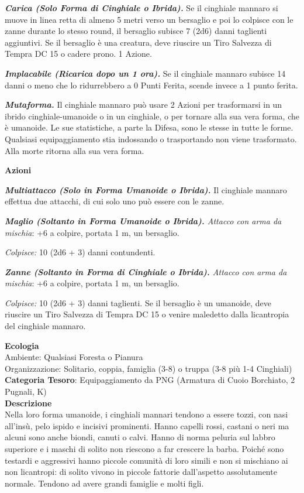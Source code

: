 \begin{multicols}{2}
{\emph{\textbf{Carica (Solo Forma di Cinghiale o Ibrida).}} Se il cinghiale mannaro si muove in linea retta di almeno 5 metri verso un bersaglio e poi lo colpisce con le zanne durante lo stesso round, il bersaglio subisce 7 (2d6) danni taglienti aggiuntivi. Se il bersaglio è una creatura, deve riuscire un Tiro Salvezza di Tempra DC 15 o cadere prono. 1 Azione.

\emph{\textbf{Implacabile (Ricarica dopo un 1 ora).}} Se il cinghiale mannaro subisce 14 danni o meno che lo ridurrebbero a 0 Punti Ferita, scende invece a 1 punto ferita.

\emph{\textbf{Mutaforma.}} Il cinghiale mannaro può usare 2 Azioni per trasformarsi in un ibrido cinghiale-umanoide o in un cinghiale, o per tornare alla sua vera forma, che è umanoide. Le sue statistiche, a parte la Difesa, sono le stesse in tutte le forme. Qualsiasi equipaggiamento stia indossando o trasportando non viene trasformato. Alla morte ritorna alla sua vera forma.

\textbf{Azioni}

\emph{\textbf{Multiattacco (Solo in Forma Umanoide o Ibrida).}} Il cinghiale mannaro effettua due attacchi, di cui solo uno può essere con le zanne.

\emph{\textbf{Maglio (Soltanto in Forma Umanoide o Ibrida).} Attacco con arma da mischia}: +6 a colpire, portata 1 m, un bersaglio.

\emph{Colpisce:} 10 (2d6 + 3) danni contundenti.

\emph{\textbf{Zanne (Soltanto in Forma di Cinghiale o Ibrida).} Attacco con arma da mischia}: +6 a colpire, portata 1 m, un bersaglio.

\emph{Colpisce:} 10 (2d6 + 3) danni taglienti. Se il bersaglio è un umanoide, deve riuscire un Tiro Salvezza di Tempra DC 15 o venire maledetto dalla licantropia del cinghiale mannaro.

\textbf{Ecologia}\\
Ambiente: Qualsiasi Foresta o Pianura\\
Organizzazione: Solitario, coppia, famiglia (3-8) o truppa (3-8 più 1-4 Cinghiali)\\
\textbf{Categoria Tesoro}: Equipaggiamento da PNG (Armatura di Cuoio Borchiato, 2 Pugnali, K)\\
\textbf{Descrizione}\\
Nella loro forma umanoide, i cinghiali mannari tendono a essere tozzi, con nasi all'insù, pelo ispido e incisivi prominenti. Hanno capelli rossi, castani o neri ma alcuni sono anche biondi, canuti o calvi. Hanno di norma peluria sul labbro superiore e i maschi di solito non riescono a far crescere la barba. Poiché sono testardi e aggressivi hanno piccole comunità di loro simili e non si mischiano ai non licantropi: di solito vivono in piccole fattorie dall'aspetto assolutamente normale. Tendono ad avere grandi famiglie e molti figli.

}
\end{multicols}
